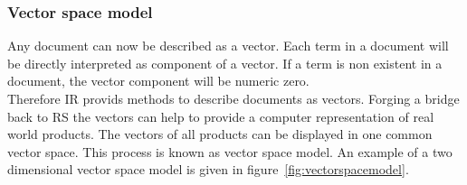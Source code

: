 \subsubsection{Vector space model}
\label{sec:vectorspacemodel}
Any document can now be described as a vector.
Each term in a document will be directly interpreted as component of a vector.
If a term is non existent in a document, the vector component will be numeric zero.\citep[p.~120]{manning:2009}\\
Therefore IR provids methods to describe documents as vectors.
Forging a bridge back to RS the vectors can help to provide a computer representation of real world products.
The vectors of all products can be displayed in one common vector space.
This process is known as vector space model.\citep[p.~120]{manning:2009}
An example of a two dimensional vector space model is given in figure~\ref{fig:vectorspacemodel}.


